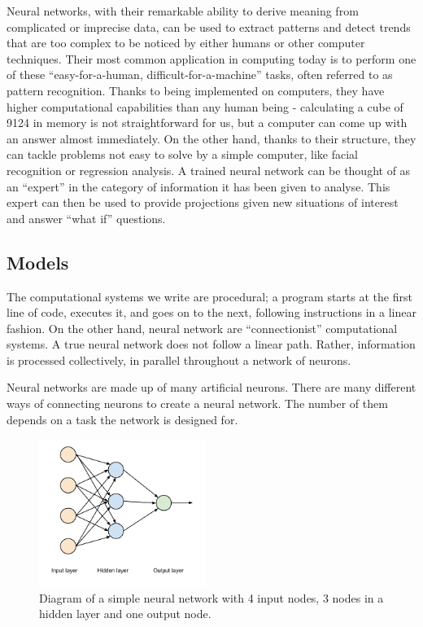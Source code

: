 Neural networks, with their remarkable ability to derive meaning from complicated or imprecise data, can be used to extract patterns and detect trends that are too complex to be noticed by either humans or other computer techniques. Their most common application in computing today is to perform one of these ``easy-for-a-human, difficult-for-a-machine'' tasks, often referred to as pattern recognition. Thanks to being implemented on computers, they have higher computational capabilities than any human being - calculating a cube of 9124 in memory is not straightforward for us, but a computer can come up with an answer almost immediately. On the other hand, thanks to their structure, they can tackle problems not easy to solve by a simple computer, like facial recognition or regression analysis.
A trained neural network can be thought of as an ``expert'' in the category of information it has been given to analyse. This expert can then be used to provide projections given new situations of interest and answer ``what if'' questions.

\vspace{10pt}

\subsection{Models}
The computational systems we write are procedural; a program starts at the first line of code, executes it, and goes on to the next, following instructions in a linear fashion.
On the other hand, neural network are ``connectionist'' computational systems. A true neural network does not follow a linear path. Rather, information is processed collectively, in parallel throughout a network of neurons.

Neural networks are made up of many artificial neurons. There are many different ways of connecting neurons to create a neural network. The number of them depends on a task the network is designed for.

\begin{figure}
  \vspace{-30pt}

  \begin{center}
    \includegraphics[width=0.48\textwidth]{Figures/simpleANN}
  \end{center}
  \caption{Diagram of a simple neural network with 4 input nodes, 3 nodes in a hidden layer and one output node.}
  \label{fig:examplennn}
\end{figure}

